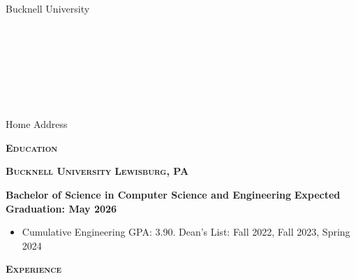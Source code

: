 \documentclass{article}
\newlength{\sectspaceabove}
\newlength{\sectspacebelow}
\newcommand{\textscbf}[1]{\textbf{\textsc{#1}}}
\newcommand{\resumesection}[1]{%
    \vspace{\sectspaceabove}%
    \begin{center}
        \textscbf{#1}
    \end{center}%
    \vspace{\sectspacebelow}%
}
\begin{document}
\begin{center}
    {\large \textscbf{\personalName}}
\end{center}

\noindent
\begin{minipage}[t]{0.33\textwidth}
    \raggedright
    Bucknell University
    \ifx\personalSchoolAddress\empty\else
    \\\personalSchoolAddress
    \fi
\end{minipage}%
\begin{minipage}[t]{0.33\textwidth} 
    \centering
    \ifx\personalEmail\empty\else
        \personalEmail%
    \fi
    \ifx\personalSchoolEmail\empty\else
        \ifx\personalEmail\empty\else\\\fi
        \personalSchoolEmail%
    \fi
    \ifx\personalPhone\empty\else
        \ifx\personalEmail\empty
            \ifx\personalSchoolEmail\empty\else\\\fi
        \else
            \\%
        \fi
        \personalPhone%
    \fi
    \ifx\personalWebsite\empty\else
        \ifx\personalEmail\empty
            \ifx\personalSchoolEmail\empty
                \ifx\personalPhone\empty\else\\\fi
            \else
                \\%
            \fi
        \else
            \\%
        \fi
        \href{https://\personalWebsite}{\personalWebsite}%
    \fi
\end{minipage}%
\begin{minipage}[t]{0.33\textwidth}
    \raggedleft
    \ifx\personalHomeAddress\empty\else
    Home Address\\
    \personalHomeAddress
    \fi
\end{minipage}

\resumesection{Education}

\textscbf{Bucknell University} \hfill \textscbf{Lewisburg, PA}

\textbf{Bachelor of Science in Computer Science and Engineering} \hfill \textbf{Expected Graduation: May 2026}
\begin{itemize}[noitemsep,topsep=2pt]
    \item Cumulative Engineering GPA: 3.90. Dean's List: Fall 2022, Fall 2023, Spring 2024
\end{itemize}

\resumesection{Experience}
\end{document}
